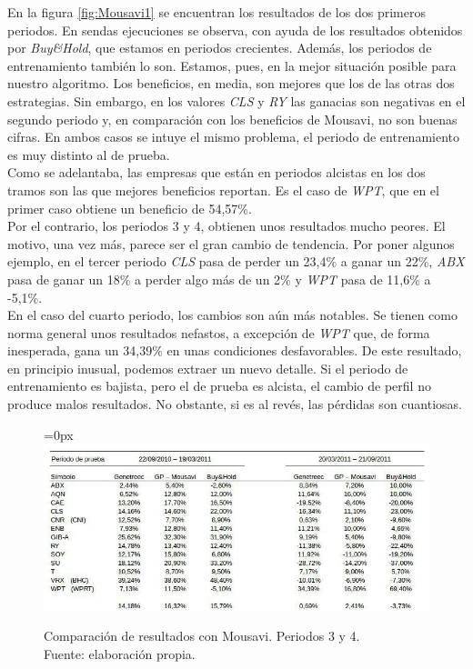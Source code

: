 En la figura \ref{fig:Mousavi1} se encuentran los resultados de los dos primeros periodos. En sendas ejecuciones se observa, con ayuda de los resultados obtenidos por \textit{Buy\&Hold}, que estamos en periodos crecientes. Adem\'as, los periodos de entrenamiento tambi\'en lo son. Estamos, pues, en la mejor situaci\'on posible para nuestro algoritmo. Los beneficios, en media, son mejores que los de las otras dos estrategias. Sin embargo, en los valores \textit{CLS} y \textit{RY} las ganacias son negativas en el segundo periodo y, en comparaci\'on con los beneficios de Mousavi, no son buenas cifras. En ambos casos se intuye el mismo problema, el periodo de entrenamiento es muy distinto al de prueba.\\

Como se adelantaba, las empresas que est\'an en periodos alcistas en los dos tramos son las que mejores beneficios reportan. Es el caso de \textit{WPT}, que en el primer caso obtiene un beneficio de 54,57\%.\\

Por el contrario, los periodos 3 y 4, obtienen unos resultados mucho peores. El motivo, una vez m\'as, parece ser el gran cambio de tendencia. Por poner algunos ejemplo, en el tercer periodo \textit{CLS} pasa de perder un 23,4\% a ganar un 22\%, \textit{ABX} pasa de ganar un 18\% a perder algo m\'as de un 2\% y \textit{WPT} pasa de 11,6\% a -5,1\%.\\

En el caso del cuarto periodo, los cambios son a\'un m\'as notables. Se tienen como norma general unos resultados nefastos, a excepci\'on de \textit{WPT} que, de forma inesperada, gana un 34,39\% en unas condiciones desfavorables. De este resultado, en principio inusual, podemos extraer un nuevo detalle. Si el periodo de entrenamiento es bajista, pero el de prueba es alcista, el cambio de perfil no produce malos resultados. No obstante, si es al rev\'es, las p\'erdidas son cuantiosas.

     	\begin{figure}[H]
     		\centering\leftskip=0px
     		\includegraphics[scale=2]{imagenes/Mousavi2.jpg}
     		\caption[Comparaci\'on de resultados con Mousavi]{Comparaci\'on de resultados con Mousavi. Periodos 3 y 4. \\ Fuente: elaboraci\'on propia.}
     		\label{fig:Mousavi2}
     	\end{figure} 

